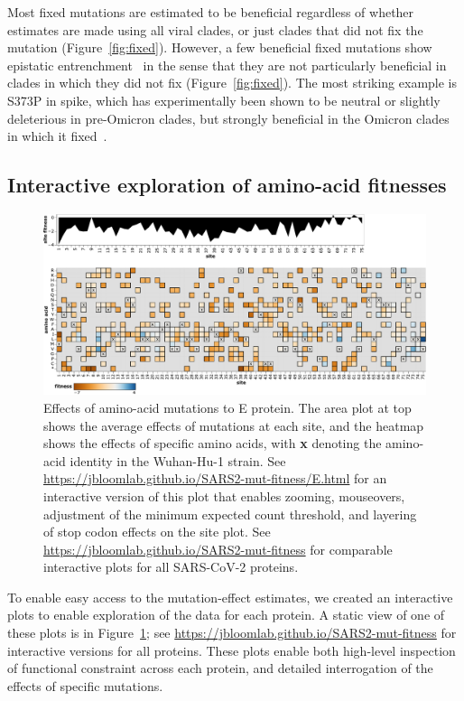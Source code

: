 \documentclass[9pt,twocolumn,twoside]{gsajnl_modified}
\begin{document}
Most fixed mutations are estimated to be beneficial regardless of whether estimates are made using all viral clades, or just clades that did not fix the mutation (Figure~\ref{fig:fixed}).
However, a few beneficial fixed mutations show epistatic entrenchment~\citep{shah2015contingency, starr2018pervasive} in the sense that they are not particularly beneficial in clades in which they did not fix (Figure~\ref{fig:fixed}).
The most striking example is S373P in spike, which has experimentally been shown to be neutral or slightly deleterious in pre-Omicron clades, but strongly beneficial in the Omicron clades in which it fixed~\citep{starr2022deep, moulana2022compensatory}.

\subsection*{Interactive exploration of amino-acid fitnesses}

\begin{figure}
\includegraphics[width=\linewidth]{figs/E_heatmap.pdf}
\caption{
Effects of amino-acid mutations to E protein.
The area plot at top shows the average effects of mutations at each site, and the heatmap shows the effects of specific amino acids, with \textbf{x} denoting the amino-acid identity in the Wuhan-Hu-1 strain.
See \url{https://jbloomlab.github.io/SARS2-mut-fitness/E.html} for an interactive version of this plot that enables zooming, mouseovers, adjustment of the minimum expected count threshold, and layering of stop codon effects on the site plot.
See \url{https://jbloomlab.github.io/SARS2-mut-fitness} for comparable interactive plots for all SARS-CoV-2 proteins.
\label{fig:E_heatmap}
}
\end{figure}

To enable easy access to the mutation-effect estimates, we created an interactive plots to enable exploration of the data for each protein.
A static view of one of these plots is in Figure~\ref{fig:E_heatmap}; see \url{https://jbloomlab.github.io/SARS2-mut-fitness} for interactive versions for all proteins.
These plots enable both high-level inspection of functional constraint across each protein, and detailed interrogation of the effects of specific mutations.
\end{document}

